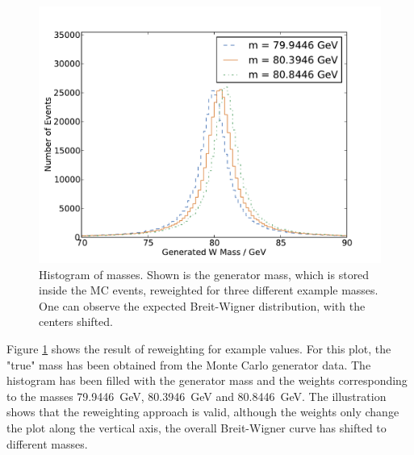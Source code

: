 \documentclass[
	paper=A4,
	parskip=full,
	chapterprefix=true,
	11pt,
	headings=normal,
	bibliography=totoc,
	listof=totoc,
	titlepage=on,
]{scrreprt}
\begin{document}
\begin{figure}
	\centering
	\includegraphics{mc_examples}
	\caption{Histogram of \PW masses. Shown is the generator \PW mass, which is stored inside the MC events, reweighted for three different example masses. One can observe the expected Breit-Wigner distribution, with the centers shifted.}
	\label{fig:mc_examples}
\end{figure}

Figure \ref{fig:mc_examples} shows the result of reweighting for example values. For this plot, the "true" \PW mass has been obtained from the Monte Carlo generator data. The histogram has been filled with the generator mass and the weights corresponding to the \PW masses \SI{79.9446}{\giga\electronvolt}, \SI{80.3946}{\giga\electronvolt} and \SI{80.8446}{\giga\electronvolt}. The illustration shows that the reweighting approach is valid, although the weights only change the plot along the vertical axis, the overall Breit-Wigner curve has shifted to different masses.
\end{document}
